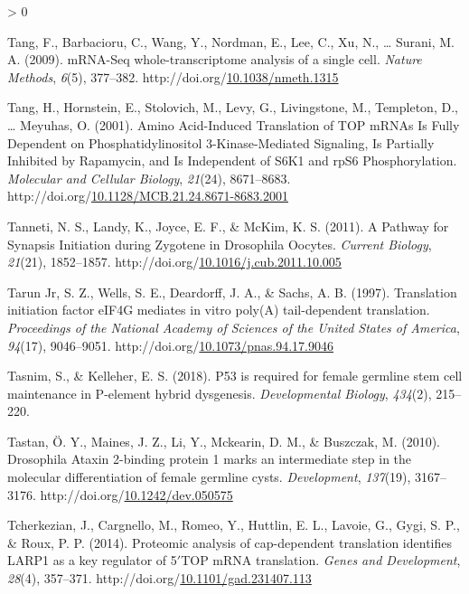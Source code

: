 \documentclass[12pt,oneside]{reedthesis}
\newlength{\cslhangindent}
\newenvironment{CSLReferences}[2] %
 {%
  \setlength{\parindent}{0pt}
  \ifodd #1 \everypar{\setlength{\hangindent}{\cslhangindent}}\ignorespaces\fi
  \ifnum #2 > 0
  \setlength{\parskip}{#2\baselineskip}
  \fi
 }%
 {}
\begin{document}
\begin{CSLReferences}{1}{0}
\leavevmode\hypertarget{ref-tangMRNASeqWholetranscriptomeAnalysis2009}{}%
Tang, F., Barbacioru, C., Wang, Y., Nordman, E., Lee, C., Xu, N., \ldots{} Surani, M. A. (2009). {mRNA-Seq} whole-transcriptome analysis of a single cell. \emph{Nature Methods}, \emph{6}(5), 377--382. http://doi.org/\href{https://doi.org/10.1038/nmeth.1315}{10.1038/nmeth.1315}

\leavevmode\hypertarget{ref-tangAminoAcidInducedTranslation2001}{}%
Tang, H., Hornstein, E., Stolovich, M., Levy, G., Livingstone, M., Templeton, D., \ldots{} Meyuhas, O. (2001). Amino {Acid-Induced Translation} of {TOP mRNAs Is Fully Dependent} on {Phosphatidylinositol} 3-{Kinase-Mediated Signaling}, {Is Partially Inhibited} by {Rapamycin}, and {Is Independent} of {S6K1} and {rpS6 Phosphorylation}. \emph{Molecular and Cellular Biology}, \emph{21}(24), 8671--8683. http://doi.org/\href{https://doi.org/10.1128/MCB.21.24.8671-8683.2001}{10.1128/MCB.21.24.8671-8683.2001}

\leavevmode\hypertarget{ref-tannetiPathwaySynapsisInitiation2011}{}%
Tanneti, N. S., Landy, K., Joyce, E. F., \& McKim, K. S. (2011). A {Pathway} for {Synapsis Initiation} during {Zygotene} in {Drosophila Oocytes}. \emph{Current Biology}, \emph{21}(21), 1852--1857. http://doi.org/\href{https://doi.org/10.1016/j.cub.2011.10.005}{10.1016/j.cub.2011.10.005}

\leavevmode\hypertarget{ref-TarunJr1997l}{}%
Tarun Jr, S. Z., Wells, S. E., Deardorff, J. A., \& Sachs, A. B. (1997). Translation initiation factor {eIF4G} mediates in vitro poly({A}) tail-dependent translation. \emph{Proceedings of the National Academy of Sciences of the United States of America}, \emph{94}(17), 9046--9051. http://doi.org/\href{https://doi.org/10.1073/pnas.94.17.9046}{10.1073/pnas.94.17.9046}

\leavevmode\hypertarget{ref-Tasnim2018a}{}%
Tasnim, S., \& Kelleher, E. S. (2018). P53 is required for female germline stem cell maintenance in {P-element} hybrid dysgenesis. \emph{Developmental Biology}, \emph{434}(2), 215--220.

\leavevmode\hypertarget{ref-tastanDrosophilaAtaxin2binding2010}{}%
Tastan, Ö. Y., Maines, J. Z., Li, Y., Mckearin, D. M., \& Buszczak, M. (2010). Drosophila {Ataxin} 2-binding protein 1 marks an intermediate step in the molecular differentiation of female germline cysts. \emph{Development}, \emph{137}(19), 3167--3176. http://doi.org/\href{https://doi.org/10.1242/dev.050575}{10.1242/dev.050575}

\leavevmode\hypertarget{ref-Tcherkezian2014b}{}%
Tcherkezian, J., Cargnello, M., Romeo, Y., Huttlin, E. L., Lavoie, G., Gygi, S. P., \& Roux, P. P. (2014). Proteomic analysis of cap-dependent translation identifies {LARP1} as a key regulator of 5{\({'}\)}{TOP mRNA} translation. \emph{Genes and Development}, \emph{28}(4), 357--371. http://doi.org/\href{https://doi.org/10.1101/gad.231407.113}{10.1101/gad.231407.113}


\end{CSLReferences}
\end{document}
